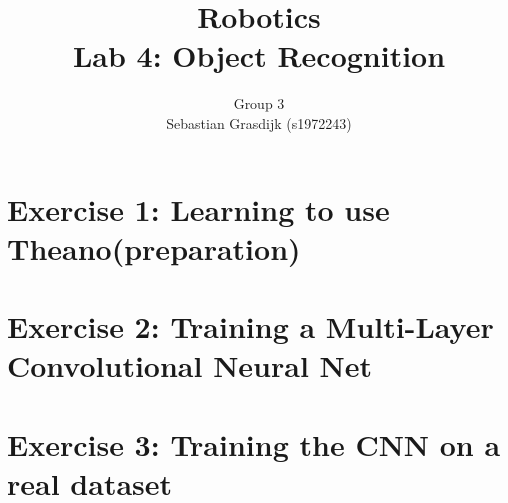 \documentclass[a4paper]{article}
\title{Robotics\\ Lab 4: Object Recognition}
\author{Group 3\\Sebastian Grasdijk (s1972243)}
\begin{document}
\maketitle

\section*{Exercise 1: Learning to use Theano(preparation)}


\section*{Exercise 2: Training a Multi-Layer Convolutional Neural Net}


\section*{Exercise 3: Training the CNN on a real dataset}


\printbibliography

\clearpage
\appendix

\end{document}
